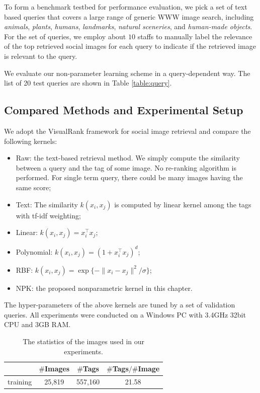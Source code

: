 To form a benchmark testbed for performance evaluation, we pick a set of text based
queries that covers a large range of generic WWW image search, including {\it
animals}, {\it plants}, {\it humans}, {\it landmarks}, {\it natural sceneries}, and {\it
human-made objects}. For the set of queries, we employ about $10$ staffs to
manually label the relevance of the top retrieved social images for each query to
indicate if the retrieved image is relevant to the query.

We evaluate our non-parameter learning scheme in a query-dependent
way. The list of 20 test queries are shown in Table \ref{table:query}.

\subsection{Compared Methods and Experimental Setup}

We adopt the VisualRank framework for social image retrieval and compare the following kernels:
\begin{itemize}
\item Raw: the text-based retrieval method. We simply compute the similarity between a
query and the tag of some image. No re-ranking algorithm is performed.
For single term query, there could be many images having the same
score;
\item Text: The similarity $k(x_i, x_j)$ is computed by linear kernel among the tags with tf-idf weighting;
\item Linear: $k(x_i, x_j) = x_i^\top x_j$;
\item Polynomial: $k(x_i, x_j) = (1 + x_i^\top x_j)^d$;
\item RBF: $k(x_i, x_j) = \exp\{-\|x_i - x_j\|^2/\sigma\}$;
\item NPK: the proposed nonparametric kernel in this chapter.
\end{itemize}
The hyper-parameters of the above kernels are tuned by a set of validation queries.
All experiments were conducted on a Windows PC with 3.4GHz 32bit CPU and 3GB
RAM.

\begin{table}[t]
\centering \caption{The statistics of the images used in our experiments. }
\begin{center}
\begin{tabular}{|l|ccc|}
\hline
&$\#$Images &$\#$Tags &$\#$Tags$/\#$Image\\
\hline
\hline
training    &25,819 &557,160    &21.58\\
\hline
\end{tabular}
\end{center}
\label{table:image}
\end{table}

